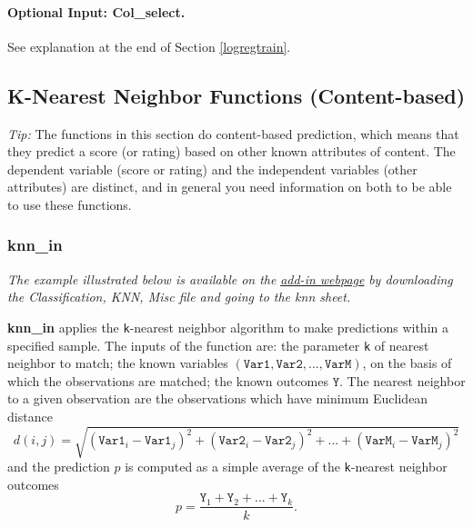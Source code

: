 \documentclass[12pt]{article}
\begin{document}
\paragraph{Optional Input: Col\_select.} See explanation at the end of Section \ref{logregtrain}.




\subsection{K-Nearest Neighbor Functions (Content-based)}

\textit{Tip:} The functions in this section do content-based prediction, which means that they predict a score (or rating) based on other known attributes of content. The dependent variable (score or rating) and the independent variables (other attributes) are distinct, and in general you need information on both to be able to use these functions.

\subsubsection{knn\_in}

\textit{The example illustrated below is available on the}  \href{https://www8.gsb.columbia.edu/bizanalytics/excel-add-in/multiplatform#h-4}{ \textit{add-in webpage}}
 \textit{by downloading the Classification, KNN, Misc file and going to the knn sheet.}

\textbf{knn\_in} applies the \texttt{k}-nearest neighbor algorithm to make predictions within a specified sample. The inputs of the function are: the parameter \texttt{k} of nearest neighbor to match; the known variables $(\texttt{Var1},\texttt{Var2},...,\texttt{VarM})$, on the basis of which the observations are matched; the known outcomes $\texttt{Y}$. The nearest neighbor to a given observation are the observations which have minimum Euclidean distance
\[
d(i,j)=\sqrt{(\texttt{Var1}_i-\texttt{Var1}_j)^2+(\texttt{Var2}_i-\texttt{Var2}_j)^2+...+(\texttt{VarM}_i-\texttt{VarM}_j)^2}
\]
and the prediction $p$ is computed as a simple average of the \texttt{k}-nearest neighbor outcomes
\[
p=\frac{\texttt{Y}_1+\texttt{Y}_2+...+\texttt{Y}_k}{k}.
\]
\end{document}
